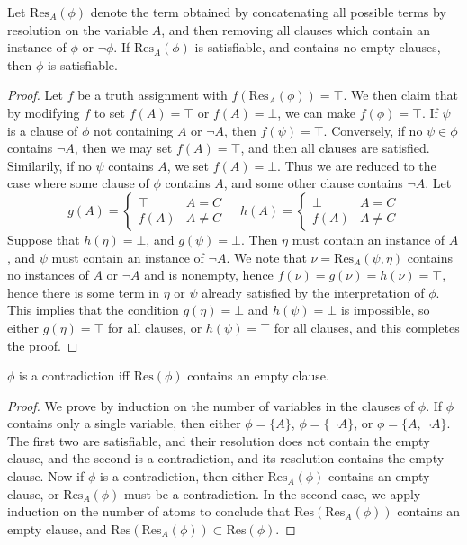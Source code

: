 \begin{lemma}
    Let $\text{Res}_A(\phi)$ denote the term obtained by concatenating all possible terms by resolution on the variable $A$, and then removing all clauses which contain an instance of $\phi$ or $\neg \phi$. If $\text{Res}_A(\phi)$ is satisfiable, and contains no empty clauses, then $\phi$ is satisfiable.
\end{lemma}
\begin{proof}
    Let $f$ be a truth assignment with $f(\text{Res}_A(\phi)) = \top$. We then claim that by modifying $f$ to set $f(A) = \top$ or $f(A) = \bot$, we can make $f(\phi) = \top$. If $\psi$ is a clause of $\phi$ not containing $A$ or $\neg A$, then $f(\psi) = \top$. Conversely, if no $\psi \in \phi$ contains $\neg A$, then we may set $f(A) = \top$, and then all clauses are satisfied. Similarily, if no $\psi$ contains $A$, we set $f(A) = \bot$. Thus we are reduced to the case where some clause of $\phi$ contains $A$, and some other clause contains $\neg A$. Let
    \[ g(A) = \begin{cases} \top & A = C\\f(A) & A \neq C \end{cases}\ \ \ \ \ h(A) = \begin{cases} \bot & A = C\\ f(A) & A \neq C \end{cases} \]
    Suppose that $h(\eta) = \bot$, and $g(\psi) = \bot$. Then $\eta$ must contain an instance of $A$, and $\psi$ must contain an instance of $\neg A$. We note that $\nu = \text{Res}_A(\psi,\eta)$ contains no instances of $A$ or $\neg A$ and is nonempty, hence $f(\nu) = g(\nu) = h(\nu) = \top$, hence there is some term in $\eta$ or $\psi$ already satisfied by the interpretation of $\phi$. This implies that the condition $g(\eta) = \bot$ and $h(\psi) = \bot$ is impossible, so either $g(\eta) = \top$ for all clauses, or $h(\psi) = \top$ for all clauses, and this completes the proof.
\end{proof}

\begin{theorem}
    $\phi$ is a contradiction iff $\text{Res}(\phi)$ contains an empty clause.
\end{theorem}
\begin{proof}
    We prove by induction on the number of variables in the clauses of $\phi$. If $\phi$ contains only a single variable, then either $\phi = \{ A \}$, $\phi = \{ \neg A \}$, or $\phi = \{ A, \neg A \}$. The first two are satisfiable, and their resolution does not contain the empty clause, and the second is a contradiction, and its resolution contains the empty clause. Now if $\phi$ is a contradiction, then either $\text{Res}_A(\phi)$ contains an empty clause, or $\text{Res}_A(\phi)$ must be a contradiction. In the second case, we apply induction on the number of atoms to conclude that $\text{Res}(\text{Res}_A(\phi))$ contains an empty clause, and $\text{Res}(\text{Res}_A(\phi)) \subset \text{Res}(\phi)$.
\end{proof}

